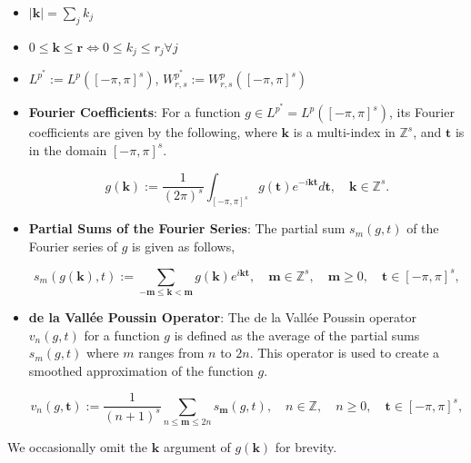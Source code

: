 \documentclass[11pt,a4paper]{article}
\theoremstyle{plain}
\theoremstyle{definition}
\theoremstyle{remark}
\begin{document}
\begin{itemize}
    \item \(\left\vert \mathbf{k}  \right\vert = \sum_{j} k_{j}\)
    \item  \(0 \leq \mathbf{k} \leq \mathbf{r}  \iff 0 \leq k_{j}\leq r_{j} \forall j\) 
    \item \(L^{p^{\ast} } := L^{p}([-\pi ,\pi ]^s) \), \(W^{p^{\ast} }_{r,s} := W^{p}_{r,s} ([-\pi ,\pi ]^s)\) 

    \item \textbf{Fourier Coefficients}: For a function \( g \in L^{p^*} = L^{p}([-\pi ,\pi ]^s) \), its Fourier coefficients are given by the following, where \( \mathbf{k} \) is a multi-index in \( \mathbb{Z}^s \), and \( \mathbf{t}  \) is in the domain \( [-\pi, \pi]^s \).

    \begin{equation}
        {g}(\mathbf{k}) := \frac{1}{(2\pi)^s} \int_{[-\pi,\pi]^s} g(\mathbf{t})e^{-i \mathbf{kt}} d \mathbf{t}, \quad \mathbf{k} \in \mathbb{Z}^s.  
    \end{equation}


    \item \textbf{Partial Sums of the Fourier Series}: The partial sum \( s_m(g, t) \) of the Fourier series of \( g \) is given as follows,
    
    \begin{equation}
        s_m(g(\mathbf{k}),t) := \sum_{-\mathbf{m} \leq \mathbf{k} < \mathbf{m}}  {g}(\mathbf{k})e^{i \mathbf{kt}}, \quad \mathbf{m}  \in \mathbb{Z}^s, \quad \mathbf{m}  \geq 0, \quad \mathbf{t} \in [-\pi, \pi]^s,
    \end{equation}

    \item \textbf{de la Vallée Poussin Operator}: The de la Vallée Poussin operator \( v_n(g, t) \) for a function \( g \) is defined as the average of the partial sums \( s_m(g, t) \) where \( m \) ranges from \( n \) to \( 2n \). This operator is used to create a smoothed approximation of the function \( g \).
    
    \begin{equation}
        v_n(g,\mathbf{t} ) := \frac{1}{(n+1)^s} \sum_{n \leq \mathbf{m} \leq 2n} s_{\mathbf{m}}(g,t), \quad n \in \mathbb{Z}, \quad n \geq 0, \quad \mathbf{t} \in [-\pi, \pi]^s,
    \end{equation}

\end{itemize}

We occasionally omit the \(\mathbf{k} \) argument of \(g(\mathbf{k} )\) for brevity.
\end{document}
